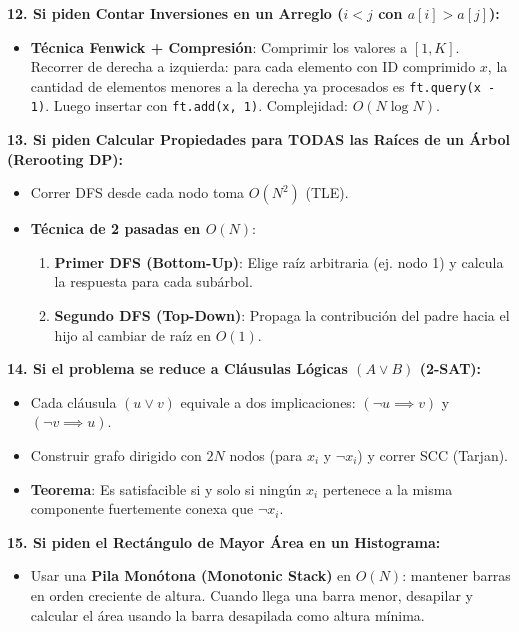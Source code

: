 \documentclass[9pt,twocolumn,a4paper]{extarticle}
\begin{document}
\textbf{12. Si piden Contar Inversiones en un Arreglo ($i < j$ con $a[i] > a[j]$):}
\begin{itemize}
    \setlength{\itemsep}{0pt}
    \item \textbf{Técnica Fenwick + Compresión}: Comprimir los valores a $[1, K]$. Recorrer de derecha a izquierda: para cada elemento con ID comprimido $x$, la cantidad de elementos menores a la derecha ya procesados es \texttt{ft.query(x - 1)}. Luego insertar con \texttt{ft.add(x, 1)}. Complejidad: $O(N \log N)$.
\end{itemize}

\textbf{13. Si piden Calcular Propiedades para TODAS las Raíces de un Árbol (Rerooting DP):}
\begin{itemize}
    \setlength{\itemsep}{0pt}
    \item Correr DFS desde cada nodo toma $O(N^2)$ (TLE).
    \item \textbf{Técnica de 2 pasadas en $O(N)$}:
    \begin{enumerate}
        \item \textbf{Primer DFS (Bottom-Up)}: Elige raíz arbitraria (ej. nodo 1) y calcula la respuesta para cada subárbol.
        \item \textbf{Segundo DFS (Top-Down)}: Propaga la contribución del padre hacia el hijo al cambiar de raíz en $O(1)$.
    \end{enumerate}
\end{itemize}

\textbf{14. Si el problema se reduce a Cláusulas Lógicas $(A \lor B)$ (2-SAT):}
\begin{itemize}
    \setlength{\itemsep}{0pt}
    \item Cada cláusula $(u \lor v)$ equivale a dos implicaciones: $(\neg u \implies v)$ y $(\neg v \implies u)$.
    \item Construir grafo dirigido con $2N$ nodos (para $x_i$ y $\neg x_i$) y correr SCC (Tarjan).
    \item \textbf{Teorema}: Es satisfacible si y solo si ningún $x_i$ pertenece a la misma componente fuertemente conexa que $\neg x_i$.
\end{itemize}

\textbf{15. Si piden el Rectángulo de Mayor Área en un Histograma:}
\begin{itemize}
    \setlength{\itemsep}{0pt}
    \item Usar una \textbf{Pila Monótona (Monotonic Stack)} en $O(N)$: mantener barras en orden creciente de altura. Cuando llega una barra menor, desapilar y calcular el área usando la barra desapilada como altura mínima.
\end{itemize}
\end{document}
